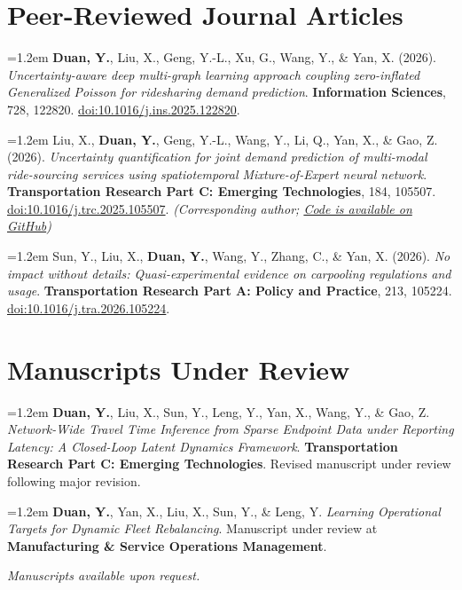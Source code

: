 \documentclass[10.6pt,letterpaper]{article}
\newcommand{\papertitle}[1]{\emph{#1}}
\newcommand{\researchitem}[1]{\par\hangindent=1.2em\hangafter=1 #1\par\vspace{5pt}}
\begin{document}
\section*{Peer-Reviewed Journal Articles}
\researchitem{\textbf{Duan, Y.}, Liu, X., Geng, Y.-L., Xu, G., Wang, Y., \& Yan, X. (2026). \papertitle{Uncertainty-aware deep multi-graph learning approach coupling zero-inflated Generalized Poisson for ridesharing demand prediction}. \textbf{Information Sciences}, 728, 122820. \href{https://doi.org/10.1016/j.ins.2025.122820}{doi:10.1016/j.ins.2025.122820}.}
\researchitem{Liu, X., \textbf{Duan, Y.}, Geng, Y.-L., Wang, Y., Li, Q., Yan, X., \& Gao, Z. (2026). \papertitle{Uncertainty quantification for joint demand prediction of multi-modal ride-sourcing services using spatiotemporal Mixture-of-Expert neural network}. \textbf{Transportation Research Part C: Emerging Technologies}, 184, 105507. \href{https://doi.org/10.1016/j.trc.2025.105507}{doi:10.1016/j.trc.2025.105507}. \textit{(Corresponding author; \href{https://github.com/yduan12323/MoE-UQ-Refactored}{Code is available on GitHub})}}
\researchitem{Sun, Y., Liu, X., \textbf{Duan, Y.}, Wang, Y., Zhang, C., \& Yan, X. (2026). \papertitle{No impact without details: Quasi-experimental evidence on carpooling regulations and usage}. \textbf{Transportation Research Part A: Policy and Practice}, 213, 105224. \href{https://doi.org/10.1016/j.tra.2026.105224}{doi:10.1016/j.tra.2026.105224}.}

\section*{Manuscripts Under Review}
\researchitem{\textbf{Duan, Y.}, Liu, X., Sun, Y., Leng, Y., Yan, X., Wang, Y., \& Gao, Z. \papertitle{Network-Wide Travel Time Inference from Sparse Endpoint Data under Reporting Latency: A Closed-Loop Latent Dynamics Framework}. \textbf{Transportation Research Part C: Emerging Technologies}. Revised manuscript under review following major revision.}
\researchitem{\textbf{Duan, Y.}, Yan, X., Liu, X., Sun, Y., \& Leng, Y. \papertitle{Learning Operational Targets for Dynamic Fleet Rebalancing}. Manuscript under review at \textbf{Manufacturing \& Service Operations Management}.}
\vspace{2pt}\textit{Manuscripts available upon request.}

\newpage
\end{document}
